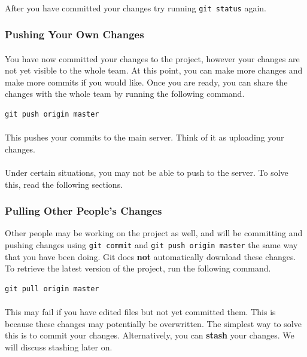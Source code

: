 \documentclass[11pt]{article}
\begin{document}
\paragraph{}
After you have committed your changes try running \lstinline{git status} again.
\subsubsection{Pushing Your Own Changes}
\paragraph{}
You have now committed your changes to the project, however your changes are not yet visible to the whole team. At this point, you can make more changes and make more commits if you would like. Once you are ready, you can share the changes with the whole team by running the following command.
\begin{lstlisting}
git push origin master
\end{lstlisting}
\paragraph{}
This pushes your commits to the main server. Think of it as uploading your changes.
\paragraph{}
Under certain situations, you may not be able to push to the server. To solve this, read the following sections.
\subsubsection{Pulling Other People's Changes}
Other people may be working on the project as well, and will be committing and pushing changes using \lstinline{git commit} and \lstinline{git push origin master} the same way that you have been doing. Git does \textbf{not} automatically download these changes. To retrieve the latest version of the project, run the following command.
\begin{lstlisting}
git pull origin master
\end{lstlisting}
\paragraph{}
This may fail if you have edited files but not yet committed them. This is because these changes may potentially be overwritten. The simplest way to solve this is to commit your changes. Alternatively, you can \textbf{stash} your changes. We will discuss stashing later on.
\end{document}
